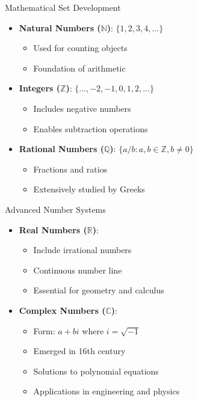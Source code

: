 \documentclass[aspectratio=169,11pt]{beamer}
\newcommand{\concept}[1]{\textbf{\color{accentcolor}#1}}
\begin{document}
\begin{frame}{Mathematical Set Development}
\begin{itemize}
\item \concept{Natural Numbers ($\mathbb{N}$)}: $\{1, 2, 3, 4, ...\}$
\begin{itemize}
\item Used for counting objects
\item Foundation of arithmetic
\end{itemize}
\vspace{0.3cm}
\item \concept{Integers ($\mathbb{Z}$)}: $\{..., -2, -1, 0, 1, 2, ...\}$
\begin{itemize}
\item Includes negative numbers
\item Enables subtraction operations
\end{itemize}
\vspace{0.3cm}
\item \concept{Rational Numbers ($\mathbb{Q}$)}: $\{a/b : a,b \in \mathbb{Z}, b \neq 0\}$
\begin{itemize}
\item Fractions and ratios
\item Extensively studied by Greeks
\end{itemize}
\end{itemize}
\end{frame}

\begin{frame}{Advanced Number Systems}
\begin{itemize}
\item \concept{Real Numbers ($\mathbb{R}$)}:
\begin{itemize}
\item Include irrational numbers
\item Continuous number line
\item Essential for geometry and calculus
\end{itemize}
\vspace{0.5cm}
\item \concept{Complex Numbers ($\mathbb{C}$)}:
\begin{itemize}
\item Form: $a + bi$ where $i = \sqrt{-1}$
\item Emerged in 16th century
\item Solutions to polynomial equations
\item Applications in engineering and physics
\end{itemize}
\end{itemize}
\end{frame}
\end{document}
